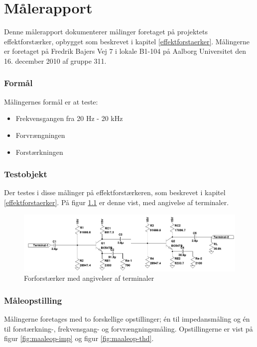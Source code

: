 \chapter{Målerapport}
\label{maalejournal}

Denne målerapport dokumenterer målinger foretaget på projektets effektforstærker, opbygget som beskrevet i kapitel \ref{effektforstaerker}. Målingerne er foretaget på Fredrik Bajers Vej 7 i lokale B1-104 på Aalborg Universitet den 16. december 2010 af gruppe 311.

\subsection*{Formål}

Målingernes formål er at teste:
\begin{itemize}
\item Frekvensgangen fra 20 Hz - 20 kHz
\item Forvrængningen
\item Forstærkningen
\end{itemize}

\subsection*{Testobjekt}
Der testes i disse målinger på effektforstærkeren, som beskrevet i kapitel \ref{effektforstaerker}. På figur \ref{fig:testob_efforstaerker} er denne vist, med angivelse af terminaler.

\begin{figure}[h]
\centering
\includegraphics[scale=0.42]{maalerapporter/forforstaerker/testobjekt-forforstaerker.png}
\caption{Forforstærker med angivelser af terminaler}
\label{fig:testob_efforstaerker}
\end{figure}

\subsection*{Måleopstilling}
Målingerne foretages med to forskellige opstillinger; én til impedansmåling og én til forstærkning-, frekvensgang- og forvrængningsmåling. Opstillingerne er vist på figur \ref{fig:maaleop-imp} og figur \ref{fig:maaleop-thd}.%

